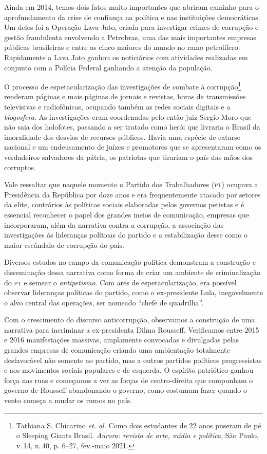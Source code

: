 Ainda em 2014, temos dois fatos muito importantes que abriram caminho
para o aprofundamento da crise de confiança na política e nas
instituições democráticas. Um deles foi a Operação Lava Jato, criada
para investigar crimes de corrupção e gestão fraudulenta envolvendo a
Petrobras, uma das mais importantes empresas públicas brasileiras e
entre as cinco maiores do mundo no ramo petrolífero. Rapidamente a Lava
Jato ganhou os noticiários com atividades realizadas em conjunto com a
Polícia Federal ganhando a atenção da população.

O processo de espetacularização das investigações de combate à corrupção\footnote{Tathiana S. Chicarino \textit{et. al.} Como dois estudantes de 22 anos puseram de pé o Sleeping Giants Brasil. \textit{Aurora: revista de arte, mídia e política}, São Paulo, v.\,14, n.\,40, p. 6--27, fev.-maio 2021.}
renderam páginas e mais páginas de jornais e revistas,
horas de transmissões televisivas e radiofônicas, ocupando também as
redes sociais digitais e a \textit{blogosfera}. As investigações eram coordenadas
pelo então juiz Sergio Moro que não saia dos holofotes, passando a ser
tratado como herói que livraria o Brasil da imoralidade dos desvios de
recursos públicos. Havia uma espécie de catarse nacional e um
endeusamento de juízes e promotores que se apresentaram como os
verdadeiros salvadores da pátria, os patriotas que tirariam o país das
mãos dos corruptos.

Vale ressaltar que naquele momento o Partido dos Trabalhadores (\textsc{pt})
ocupava a Presidência da República por doze anos e era frequentemente
atacado por setores da elite, contrários às políticas sociais elaboradas
pelos governos petistas e é essencial reconhecer o papel dos grandes
meios de comunicação, empresas que incorporaram, além da narrativa contra
a corrupção, a associação das investigações às lideranças políticas
do partido e a estabilização desse como o maior escândalo de corrupção do
país.

Diversos estudos no campo da comunicação política demonstram a
construção e disseminação dessa narrativa como forma de criar um
ambiente de criminalização do \textsc{pt} e semear o
\textit{antipetismo}. Com ares de espetacularização, era possível observar
lideranças políticas do partido, como o ex-presidente Lula, inegavelmente o alvo
central das operações, ser nomeado ``chefe de quadrilha''.

Com o crescimento do discurso anticorrupção, observamos a construção de
uma narrativa para incriminar a ex-presidenta Dilma Rousseff. 
Verificamos entre 2015 e 2016 manifestações massivas, amplamente
convocadas e divulgadas pelas grandes empresas de comunicação criando
uma ambientação totalmente desfavorável não somente ao partido, mas a
outros partidos políticos progressistas e aos movimentos sociais
populares e de esquerda. O espírito patriótico ganhou força nas ruas e
começamos a ver as forças de centro-direita que compunham o governo de
Rousseff abandonando o governo, como costumam fazer quando o vento
começa a mudar os rumos no país.

